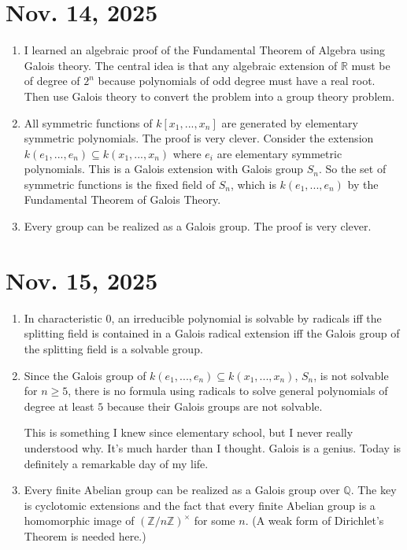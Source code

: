 \documentclass[15pt]{scrartcl}
\newcommand{\R}{\mathbb{R}}
\newcommand{\Q}{\mathbb{Q}}
\newcommand{\Z}{\mathbb{Z}}
\begin{document}
\section{Nov. 14, 2025}
\begin{enumerate}
\item I learned an algebraic proof of the Fundamental Theorem of Algebra using Galois theory. The central idea is that any algebraic extension of $\R$ must be of degree of $2^n$ because polynomials of odd degree must have a real root. Then use Galois theory to convert the problem into a group theory problem.
\item All symmetric functions of $k[x_1,...,x_n]$ are generated by elementary symmetric polynomials. The proof is very clever. Consider the extension $k(e_1,...,e_n)\subseteq k(x_1,...,x_n)$ where $e_i$ are elementary symmetric polynomials. This is a Galois extension with Galois group $S_n$. So the set of symmetric functions is the fixed field of $S_n$, which is $k(e_1,...,e_n)$ by the Fundamental Theorem of Galois Theory.
\item Every group can be realized as a Galois group. The proof is very clever. 
\end{enumerate}
\section{Nov. 15, 2025}
\begin{enumerate}
\item In characteristic $0$, an irreducible polynomial is solvable by radicals iff the splitting field is contained in a Galois radical extension iff the Galois group of the splitting field is a solvable group.
\item Since the Galois group of $k(e_1,...,e_n)\subseteq k(x_1,...,x_n)$, $S_n$, is not solvable for $n\geq 5$, there is no formula using radicals to solve general polynomials of degree at least $5$ because their Galois groups are not solvable. 
\begin{remark}
    This is something I knew since elementary school, but I never really understood why. It's much harder than I thought. Galois is a genius. Today is definitely a remarkable day of my life.
\end{remark}
\item Every finite Abelian group can be realized as a Galois group over $\Q$. The key is cyclotomic extensions and the fact that every finite Abelian group is a homomorphic image of $(\Z/n\Z)^{\times}$ for some $n$. (A weak form of Dirichlet's Theorem is needed here.)
\end{enumerate}
\end{document}
